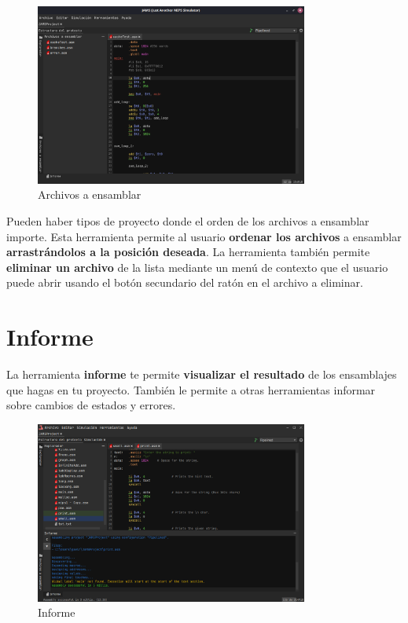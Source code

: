 \begin{figure}[H]
    \centering
    \includegraphics[width=0.8\textwidth]{images/tools/jams-files-to-assemble}
    \caption{Archivos a ensamblar}
    \label{fig:jams-files-to-assemble}
\end{figure}

\noindent Pueden haber tipos de proyecto donde el
orden de los archivos a ensamblar importe.
Esta herramienta permite al usuario \textbf{ordenar los archivos}
a ensamblar \textbf{arrastrándolos a la posición deseada}.
La herramienta también permite \textbf{eliminar un archivo} de la lista
mediante un menú de contexto que el usuario puede abrir usando
el botón secundario del ratón en el archivo a eliminar.


\section{Informe}\label{sec:informe}

La herramienta \textbf{informe} te permite \textbf{visualizar el resultado}
de los ensamblajes que hagas en tu proyecto.
También le permite a otras herramientas informar sobre cambios de estados y errores.

\begin{figure}[H]
    \centering
    \includegraphics[width=0.8\textwidth]{images/tools/jams-log}
    \caption{Informe}
    \label{fig:jams-log}
\end{figure}

